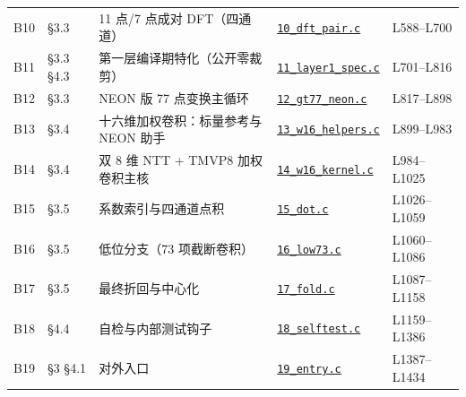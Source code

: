 \begin{table}[htbp]
\begin{tabular}{@{}llp{4.25cm}p{2.95cm}l@{}}
B10 & \S3.3 & \raggedright 11 点/7 点成对 DFT（四通道） & \raggedright \href{https://github.com/karry190805/sntrup653-crt-neon/blob/b17bbf3/src/10_dft_pair.c}{\texttt{10\_\allowbreak{}dft\_\allowbreak{}pair.c}} & L588--L700 \\
B11 & \S3.3 \S4.3 & \raggedright 第一层编译期特化（公开零裁剪） & \raggedright \href{https://github.com/karry190805/sntrup653-crt-neon/blob/b17bbf3/src/11_layer1_spec.c}{\texttt{11\_\allowbreak{}layer1\_\allowbreak{}spec.c}} & L701--L816 \\
B12 & \S3.3 & \raggedright NEON 版 77 点变换主循环 & \raggedright \href{https://github.com/karry190805/sntrup653-crt-neon/blob/b17bbf3/src/12_gt77_neon.c}{\texttt{12\_\allowbreak{}gt77\_\allowbreak{}neon.c}} & L817--L898 \\
B13 & \S3.4 & \raggedright 十六维加权卷积：标量参考与 NEON 助手 & \raggedright \href{https://github.com/karry190805/sntrup653-crt-neon/blob/b17bbf3/src/13_w16_helpers.c}{\texttt{13\_\allowbreak{}w16\_\allowbreak{}helpers.c}} & L899--L983 \\
B14 & \S3.4 & \raggedright 双 8 维 NTT + TMVP8 加权卷积主核 & \raggedright \href{https://github.com/karry190805/sntrup653-crt-neon/blob/b17bbf3/src/14_w16_kernel.c}{\texttt{14\_\allowbreak{}w16\_\allowbreak{}kernel.c}} & L984--L1025 \\
B15 & \S3.5 & \raggedright 系数索引与四通道点积 & \raggedright \href{https://github.com/karry190805/sntrup653-crt-neon/blob/b17bbf3/src/15_dot.c}{\texttt{15\_\allowbreak{}dot.c}} & L1026--L1059 \\
B16 & \S3.5 & \raggedright 低位分支（73 项截断卷积） & \raggedright \href{https://github.com/karry190805/sntrup653-crt-neon/blob/b17bbf3/src/16_low73.c}{\texttt{16\_\allowbreak{}low73.c}} & L1060--L1086 \\
B17 & \S3.5 & \raggedright 最终折回与中心化 & \raggedright \href{https://github.com/karry190805/sntrup653-crt-neon/blob/b17bbf3/src/17_fold.c}{\texttt{17\_\allowbreak{}fold.c}} & L1087--L1158 \\
B18 & \S4.4 & \raggedright 自检与内部测试钩子 & \raggedright \href{https://github.com/karry190805/sntrup653-crt-neon/blob/b17bbf3/src/18_selftest.c}{\texttt{18\_\allowbreak{}selftest.c}} & L1159--L1386 \\
B19 & \S3 \S4.1 & \raggedright 对外入口 & \raggedright \href{https://github.com/karry190805/sntrup653-crt-neon/blob/b17bbf3/src/19_entry.c}{\texttt{19\_\allowbreak{}entry.c}} & L1387--L1434 \\
\bottomrule
\end{tabular}
\end{table}
